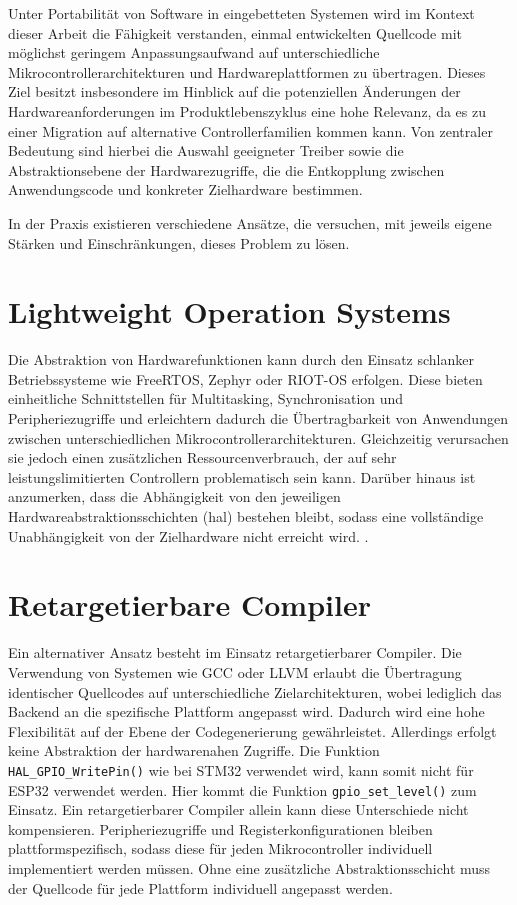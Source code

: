 
Unter Portabilität von Software in eingebetteten Systemen wird im Kontext dieser Arbeit die Fähigkeit verstanden, einmal entwickelten Quellcode mit möglichst geringem Anpassungsaufwand auf unterschiedliche Mikrocontrollerarchitekturen und Hardwareplattformen zu übertragen. 
Dieses Ziel besitzt insbesondere im Hinblick auf die potenziellen Änderungen der Hardwareanforderungen im Produktlebenszyklus eine hohe Relevanz, da es zu einer Migration auf alternative Controllerfamilien kommen kann.
Von zentraler Bedeutung sind hierbei die Auswahl geeigneter Treiber sowie die Abstraktionsebene der Hardwarezugriffe, die die Entkopplung zwischen Anwendungscode und konkreter Zielhardware bestimmen.

In der Praxis existieren verschiedene Ansätze, die versuchen, mit jeweils eigene Stärken und Einschränkungen, dieses Problem zu lösen.

\section{Lightweight Operation Systems}
Die Abstraktion von Hardwarefunktionen kann durch den Einsatz schlanker Betriebssysteme wie FreeRTOS, Zephyr oder RIOT-OS erfolgen. 
Diese bieten einheitliche Schnittstellen für Multitasking, Synchronisation und Peripheriezugriffe und erleichtern dadurch die Übertragbarkeit von Anwendungen zwischen unterschiedlichen Mikrocontrollerarchitekturen. 
Gleichzeitig verursachen sie jedoch einen zusätzlichen Ressourcenverbrauch, der auf sehr leistungslimitierten Controllern problematisch sein kann.
 Darüber hinaus ist anzumerken, dass die Abhängigkeit von den jeweiligen Hardwareabstraktionsschichten (\gls{hal}) bestehen bleibt, sodass eine vollständige Unabhängigkeit von der Zielhardware nicht erreicht wird. \cite{freertos}\cite{zephyr}\cite{riot}.  


\section{Retargetierbare Compiler}
Ein alternativer Ansatz besteht im Einsatz retargetierbarer Compiler. 
Die Verwendung von Systemen wie GCC oder LLVM erlaubt die Übertragung identischer Quellcodes auf unterschiedliche Zielarchitekturen, wobei lediglich das Backend an die spezifische Plattform angepasst wird.
Dadurch wird eine hohe Flexibilität auf der Ebene der Codegenerierung gewährleistet. 
Allerdings erfolgt keine Abstraktion der hardwarenahen Zugriffe.
Die Funktion \texttt{HAL\_GPIO\_WritePin()} wie bei STM32 verwendet wird, kann somit nicht für ESP32 verwendet werden.
Hier kommt die Funktion \texttt{gpio\_set\_level()} zum Einsatz.
Ein retargetierbarer Compiler allein kann diese Unterschiede nicht kompensieren. 
Peripheriezugriffe und Registerkonfigurationen bleiben plattformspezifisch, sodass diese für jeden Mikrocontroller individuell implementiert werden müssen. 
Ohne eine zusätzliche Abstraktionsschicht muss der Quellcode für jede Plattform individuell angepasst werden.\cite{gccint}\cite{llvm}\cite{johnson1975}

